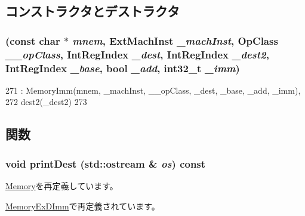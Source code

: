 \subsection{コンストラクタとデストラクタ}
\hypertarget{classArmISA_1_1MemoryDImm_a14b02c0b6166e4a44111fb50ae1e489a}{
\subsubsection[{MemoryDImm}]{ (const char $\ast$ {\em mnem}, \/  {\bf ExtMachInst} {\em \_\-machInst}, \/  OpClass {\em \_\-\_\-opClass}, \/  {\bf IntRegIndex} {\em \_\-dest}, \/  {\bf IntRegIndex} {\em \_\-dest2}, \/  {\bf IntRegIndex} {\em \_\-base}, \/  bool {\em \_\-add}, \/  int32\_\-t {\em \_\-imm})}}
\label{classArmISA_1_1MemoryDImm_a14b02c0b6166e4a44111fb50ae1e489a}



\begin{DoxyCode}
271         : MemoryImm(mnem, _machInst, __opClass, _dest, _base, _add, _imm),
272           dest2(_dest2)
273     {}
\end{DoxyCode}


\subsection{関数}
\hypertarget{classArmISA_1_1MemoryDImm_adee5df6e5d6b0c498363aabda42431fa}{
\subsubsection[{printDest}]{\setlength{\rightskip}{0pt plus 5cm}void printDest (std::ostream \& {\em os}) const}}
\label{classArmISA_1_1MemoryDImm_adee5df6e5d6b0c498363aabda42431fa}


\hyperlink{classArmISA_1_1Memory_a9a9365f7ef96d4838529320970308a57}{Memory}を再定義しています。

\hyperlink{classArmISA_1_1MemoryExDImm_adee5df6e5d6b0c498363aabda42431fa}{MemoryExDImm}で再定義されています。


